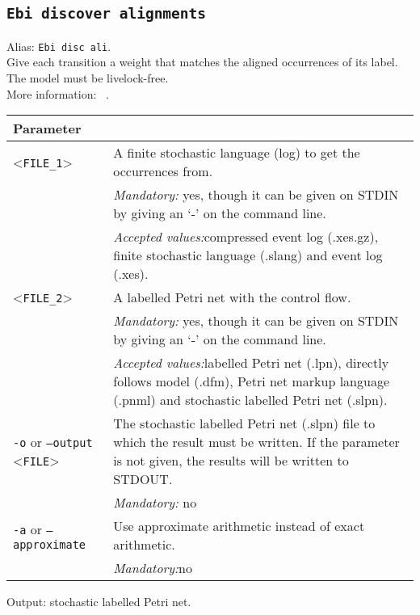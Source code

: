 {\subsection{\texttt{Ebi discover alignments}}
\label{command:Ebi discover alignments}
Alias: \texttt{Ebi disc ali}.\\
Give each transition a weight that matches the aligned occurrences of its label. The model must be livelock-free.\\
More information: ~\cite{DBLP:conf/icpm/BurkeLW20}.\\
\begin{tabularx}{\linewidth}{lX}
\toprule
Parameter \\\midrule
<\texttt{FILE\_1}>&A finite stochastic language (log) to get the occurrences from.\\
&\textit{Mandatory:} \quad yes, though it can be given on STDIN by giving an `-' on the command line.\\
&\textit{Accepted values:}\quad compressed event log (.xes.gz), finite stochastic language (.slang) and event log (.xes).\\
<\texttt{FILE\_2}>&A labelled Petri net with the control flow.\\
&\textit{Mandatory:} \quad yes, though it can be given on STDIN by giving an `-' on the command line.\\
&\textit{Accepted values:}\quad labelled Petri net (.lpn), directly follows model (.dfm), Petri net markup language (.pnml) and stochastic labelled Petri net (.slpn).\\
\texttt{-o} or \texttt{--output} <\texttt{FILE}> &
The stochastic labelled Petri net (.slpn) file to which the result must be written. If the parameter is not given, the results will be written to STDOUT.\\
&\textit{Mandatory:} \quad no\\
\texttt{-a} or \texttt{--approximate} & Use approximate arithmetic instead of exact arithmetic.\\
&\textit{Mandatory:}\quad no\\
\bottomrule
\end{tabularx}
Output: stochastic labelled Petri net.
}
